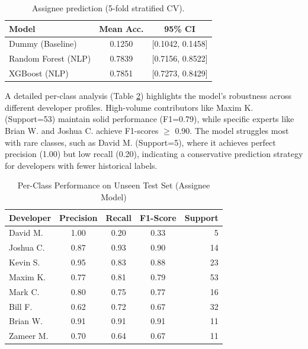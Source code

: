 \documentclass[conference]{IEEEtran}
\begin{document}
\begin{table}[t]
\caption{Assignee prediction (5-fold stratified CV).}
\centering
\renewcommand{\arraystretch}{1.08}
\begin{tabular}{l c c}
\hline
\textbf{Model} & \textbf{Mean Acc.} & \textbf{95\% CI} \\
\hline
Dummy (Baseline) & 0.1250 & [0.1042, 0.1458] \\
Random Forest (NLP) & 0.7839 & [0.7156, 0.8522] \\
XGBoost (NLP) & 0.7851 & [0.7273, 0.8429] \\
\hline
\end{tabular}
\label{tab:assignee_cv}
\end{table}

A detailed per-class analysis (Table \ref{tab:assignee_class_report}) highlights the model's robustness across different developer profiles. High-volume contributors like Maxim K. (Support=53) maintain solid performance (F1=0.79), while specific experts like Brian W. and Joshua C. achieve F1-scores $\ge$ 0.90. The model struggles most with rare classes, such as David M. (Support=5), where it achieves perfect precision (1.00) but low recall (0.20), indicating a conservative prediction strategy for developers with fewer historical labels.

\begin{table}[t]
\caption{Per-Class Performance on Unseen Test Set (Assignee Model)}
\centering
\renewcommand{\arraystretch}{1.1}
\begin{tabular}{l c c c r}
\hline
\textbf{Developer} & \textbf{Precision} & \textbf{Recall} & \textbf{F1-Score} & \textbf{Support} \\
\hline
David M.   & 1.00 & 0.20 & 0.33 & 5 \\
Joshua C.  & 0.87 & 0.93 & 0.90 & 14 \\
Kevin S.   & 0.95 & 0.83 & 0.88 & 23 \\
Maxim K.   & 0.77 & 0.81 & 0.79 & 53 \\
Mark C.    & 0.80 & 0.75 & 0.77 & 16 \\
Bill F.    & 0.62 & 0.72 & 0.67 & 32 \\
Brian W.   & 0.91 & 0.91 & 0.91 & 11 \\
Zameer M.  & 0.70 & 0.64 & 0.67 & 11 \\
\hline
\end{tabular}
\label{tab:assignee_class_report}
\end{table}

\end{document}
